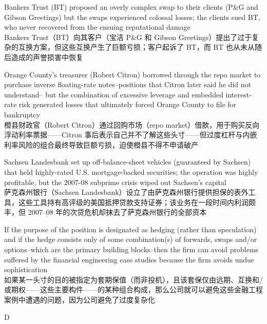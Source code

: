 \documentclass{article}
\begin{document}
    \begin{choices}
        \item Bankers Trust (BT) proposed an overly complex swap to their clients (P\&G and Gibson Greetings) but the swaps experienced colossal losses; the clients sued BT, who never
        recovered from the ensuing reputational damage\\
        Bankers Trust（BT）向其客户（宝洁 P\&G 和 Gibson Greetings）提出了过于复杂的互换方案，但这些互换产生了巨额亏损；客户起诉了 BT，而 BT 也从未从随后造成的声誉损害中恢复\
        \item  Orange County's treasurer (Robert Citron) borrowed through the repo market to purchase inverse floating-rate notes–positions that Citron later said he did not understand– but the combination of excessive leverage and embedded interest-rate risk generated losses that ultimately forced Orange County to file for bankruptcy\\
        橙县财政官（Robert Citron）通过回购市场（repo market）借款，用于购买反向浮动利率票据——Citron 事后表示自己并不了解这些头寸——但过度杠杆与内嵌利率风险的组合最终导致巨额亏损，迫使橙县不得不申请破产
        \item Sachsen Landesbank set up off-balance-sheet vehicles (guaranteed by Sachsen) that held highly-rated U.S. mortgage-backed securities; the operation was highly profitable, but the 2007-08 subprime crisis wiped out Sachsen's capital\\
        萨克森州银行（Sachsen Landesbank）设立了由萨克森州银行提供担保的表外工具，这些工具持有高评级的美国抵押贷款支持证券；该业务在一段时间内利润颇丰，但 2007–08 年的次贷危机却抹去了萨克森州银行的全部资本
        \item  If the purpose of the position is designated as hedging (rather than speculation) and if the hedge consists only of some combination(s) of forwards, swaps and/or options–which are the primary building blocks–then the firm can avoid problems suffered by the financial  engineering case studies because the firm avoids undue sophistication\\
        如果某一头寸的目的被指定为套期保值（而非投机），且该套保仅由远期、互换和/或期权——这些主要构件——的某种组合构成，那么公司就可以避免这些金融工程案例中遭遇的问题，因为公司避免了过度复杂化
        
    \end{choices}
    
    \begin{correctanswer}
    D
    \end{correctanswer}
    
\end{document}
